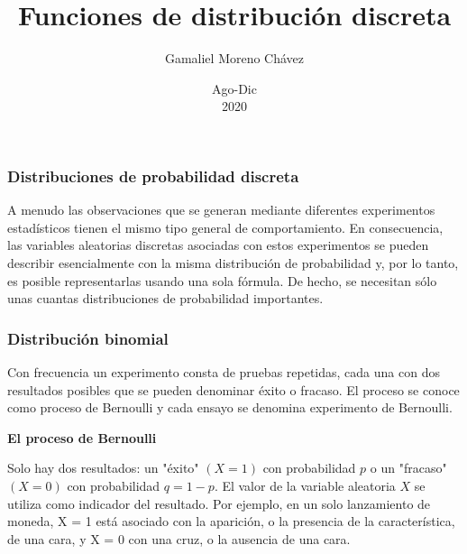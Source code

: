 \documentclass[spanish]{beamer}
\begin{document}
\title{Funciones de distribución discreta}
\author{Gamaliel Moreno Chávez}
\date{Ago-Dic\\ 2020}%

\frame{\titlepage}

\begin{frame}
\frametitle{Distribuciones de probabilidad discreta}
A menudo las observaciones que se generan mediante diferentes experimentos estadísticos tienen el mismo tipo general de comportamiento. En consecuencia, las variables aleatorias discretas asociadas con estos experimentos se pueden describir esencialmente con la misma distribución de probabilidad y, por lo tanto, es posible representarlas usando una sola fórmula. De hecho, se necesitan sólo unas cuantas distribuciones de probabilidad importantes.

\end{frame}

\begin{frame}
\frametitle{Distribución binomial}
Con frecuencia un experimento consta de pruebas repetidas, cada una con dos resultados posibles que se pueden denominar éxito o fracaso. El proceso se conoce como proceso de Bernoulli y cada ensayo se denomina experimento de Bernoulli.


\textbf{El proceso de Bernoulli}

Solo hay dos resultados: un "éxito" $(X = 1)$ con probabilidad $p$ o un "fracaso" $(X = 0)$ con probabilidad $q = 1 - p$. El valor de la variable aleatoria $X$ se utiliza como indicador del resultado. Por ejemplo, en un solo lanzamiento de moneda, X = 1 está asociado con la aparición, o la presencia de la característica, de una cara, y X = 0 con una cruz, o la ausencia de una cara.

\end{frame}
\end{document}
